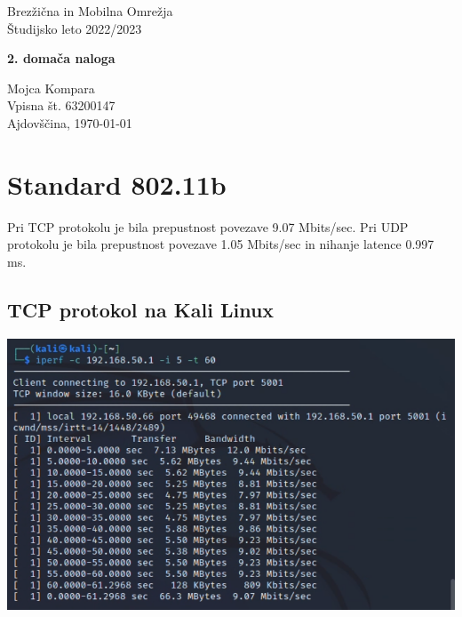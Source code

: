 \documentclass[11pt,a4paper,slovene]{article}
\begin{document}
\label{naslov}
\thispagestyle{empty}

\begin{center}
\begin{Large}
Brezžična in Mobilna Omrežja\\
Študijsko leto 2022/2023\\
\end{Large}

\vspace*{4cm}
\begin{LARGE}
\textbf{2. domača naloga\\}
\end{LARGE}
\vspace*{0.5cm}


\vspace*{4cm}

Mojca Kompara\\
Vpisna št. 63200147\\

\vspace*{5cm}
Ajdovščina, \today
\end{center}

\pagebreak
\setcounter{page}{1}


\label{Kazalo}
\tableofcontents
\thispagestyle{empty}
\pagebreak

\section{Standard 802.11b}

Pri TCP protokolu je bila prepustnost povezave 9.07 Mbits/sec.
Pri UDP protokolu je bila prepustnost povezave 1.05 Mbits/sec in nihanje latence 0.997 ms.

\subsection{TCP protokol na Kali Linux}
\includegraphics[width=\textwidth]{2_dn_tcp_b_kali}
\end{document}
